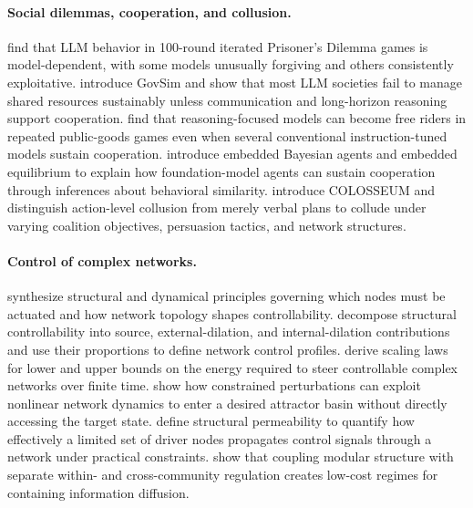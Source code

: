 \paragraph{Social dilemmas, cooperation, and collusion.}
\citet{fontana2025nicer} find that LLM behavior in 100-round iterated Prisoner's Dilemma games is model-dependent, with some models unusually forgiving and others consistently exploitative.
\citet{piatti2024cooperate} introduce GovSim and show that most LLM societies fail to manage shared resources sustainably unless communication and long-horizon reasoning support cooperation.
\citet{guzman2025corrupted} find that reasoning-focused models can become free riders in repeated public-goods games even when several conventional instruction-tuned models sustain cooperation.
\citet{meulemans2026game} introduce embedded Bayesian agents and embedded equilibrium to explain how foundation-model agents can sustain cooperation through inferences about behavioral similarity.
\citet{nakamura2026colosseum} introduce COLOSSEUM and distinguish action-level collusion from merely verbal plans to collude under varying coalition objectives, persuasion tactics, and network structures.

\paragraph{Control of complex networks.}
\citet{liu2016control} synthesize structural and dynamical principles governing which nodes must be actuated and how network topology shapes controllability.
\citet{ruths2014control} decompose structural controllability into source, external-dilation, and internal-dilation contributions and use their proportions to define network control profiles.
\citet{yan2012energy} derive scaling laws for lower and upper bounds on the energy required to steer controllable complex networks over finite time.
\citet{cornelius2013realistic} show how constrained perturbations can exploit nonlinear network dynamics to enter a desired attractor basin without directly accessing the target state.
\citet{loiudice2015structural} define structural permeability to quantify how effectively a limited set of driver nodes propagates control signals through a network under practical constraints.
\citet{chen2026community} show that coupling modular structure with separate within- and cross-community regulation creates low-cost regimes for containing information diffusion.

